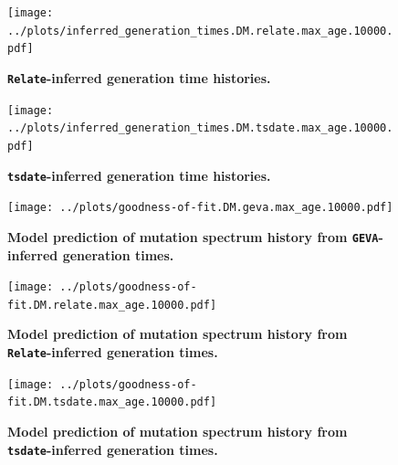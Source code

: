 \documentclass[]{article}
\newcommand{\GEVA}{\texttt{GEVA}\xspace}
\newcommand{\tsdate}{\texttt{tsdate}\xspace}
\newcommand{\relate}{\texttt{Relate}\xspace}
\begin{document}
\begin{figure}[ht!]
    \centering
    \texttt{[image: ../plots/inferred\_generation\_times.DM.relate.max\_age.10000.pdf]}
    \caption{
        \textbf{\relate-inferred generation time histories.}
    }
    \label{fig:relate-gen-times}
\end{figure}


\begin{figure}[ht!]
    \centering
    \texttt{[image: ../plots/inferred\_generation\_times.DM.tsdate.max\_age.10000.pdf]}
    \caption{
        \textbf{\tsdate-inferred generation time histories.}
    }
    \label{fig:tsdate-gen-times}
\end{figure}


\begin{figure}[ht!]
    \centering
    \texttt{[image: ../plots/goodness-of-fit.DM.geva.max\_age.10000.pdf]}
    \caption{
        \textbf{Model prediction of mutation spectrum history from
        \GEVA-inferred generation times.}
    }
    \label{fig:geva-fit}
\end{figure}

\begin{figure}[ht!]
    \centering
    \texttt{[image: ../plots/goodness-of-fit.DM.relate.max\_age.10000.pdf]}
    \caption{
        \textbf{Model prediction of mutation spectrum history from
        \relate-inferred generation times.}
    }
    \label{fig:relate-fit}
\end{figure}


\begin{figure}[ht!]
    \centering
    \texttt{[image: ../plots/goodness-of-fit.DM.tsdate.max\_age.10000.pdf]}
    \caption{
        \textbf{Model prediction of mutation spectrum history from
        \tsdate-inferred generation times.}
    }
    \label{fig:tsdate-fit}
\end{figure}
\end{document}

